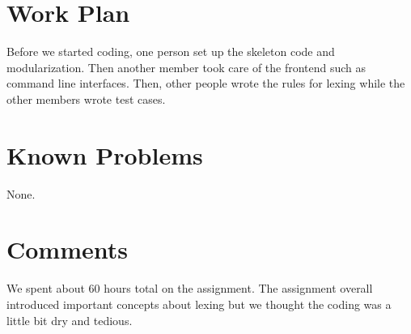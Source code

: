\documentclass{hw}
\begin{document}
\section{Work Plan}\label{sec:workplan}
Before we started coding, one person set up the skeleton code and
modularization. Then another member took care of the frontend such as command
line interfaces. Then, other people wrote the rules for lexing while the other
members wrote test cases.

\section{Known Problems}\label{sec:problems}
None.

\section{Comments}\label{sec:comments}
We spent about 60 hours total on the assignment. The assignment overall
introduced important concepts about lexing but we thought the coding was a
little bit dry and tedious.
\end{document}
